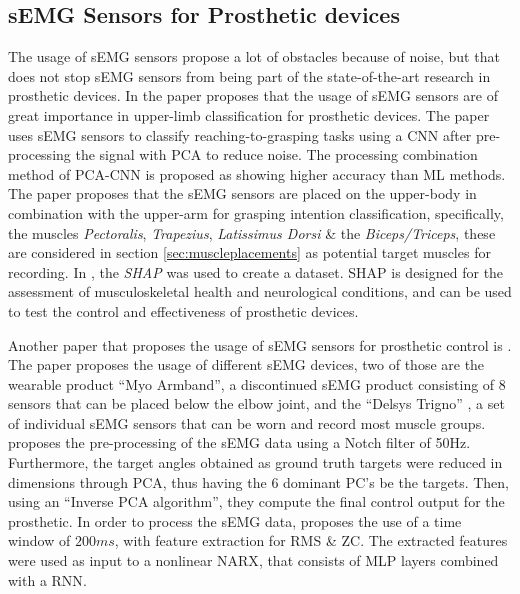 \documentclass[../main.tex]{subfiles}
\begin{document}
\subsection{sEMG Sensors for Prosthetic devices}

The usage of sEMG sensors propose a lot of obstacles because of noise, but that does not stop sEMG sensors from being part of the state-of-the-art research in prosthetic devices.
In the paper \cite{KeunTaeKim2021} proposes that the usage of sEMG sensors are of great importance in upper-limb classification for prosthetic devices.
The paper uses sEMG sensors to classify reaching-to-grasping tasks using a \gls{CNN} after pre-processing the signal with \gls{PCA} to reduce noise.
The processing combination method of PCA-CNN is proposed as showing higher accuracy than \gls{ML} methods.
The paper proposes that the sEMG sensors are placed on the upper-body in combination with the upper-arm for grasping intention classification, specifically, the muscles \textit{Pectoralis}, \textit{Trapezius}, \textit{Latissimus Dorsi} \& the \textit{Biceps/Triceps}, these are considered in section \ref{sec:muscleplacements} as potential target muscles for recording.
In \cite{KeunTaeKim2021}, the \textit{\gls{SHAP}} \cite{shap} was used to create a dataset.
\gls{SHAP} is designed for the assessment of musculoskeletal health and neurological conditions, and can be used to test the control and effectiveness of prosthetic devices.

Another paper that proposes the usage of sEMG sensors for prosthetic control is \cite{Zhaolong2021}.
The paper proposes the usage of different sEMG devices, two of those are the wearable product ``Myo Armband'', \cite{myo} a discontinued sEMG product consisting of 8 sensors that can be placed below the elbow joint, and the ``Delsys Trigno'' \cite{trigno}, a set of individual sEMG sensors that can be worn and record most muscle groups.
\cite{Zhaolong2021} proposes the pre-processing of the sEMG data using a Notch filter of 50Hz.
Furthermore, the target angles obtained as ground truth targets were reduced in dimensions through PCA, thus having the 6 dominant PC's be the targets.
Then, using an ``Inverse PCA algorithm'', they compute the final control output for the prosthetic.
In order to process the sEMG data, \cite{Zhaolong2021} proposes the use of a time window of $200ms$, with feature extraction for \gls{RMS} \& \gls{ZC}.
The extracted features were used as input to a nonlinear \gls{NARX}, that consists of \gls{MLP}   layers combined with a \gls{RNN}. 
\end{document}
